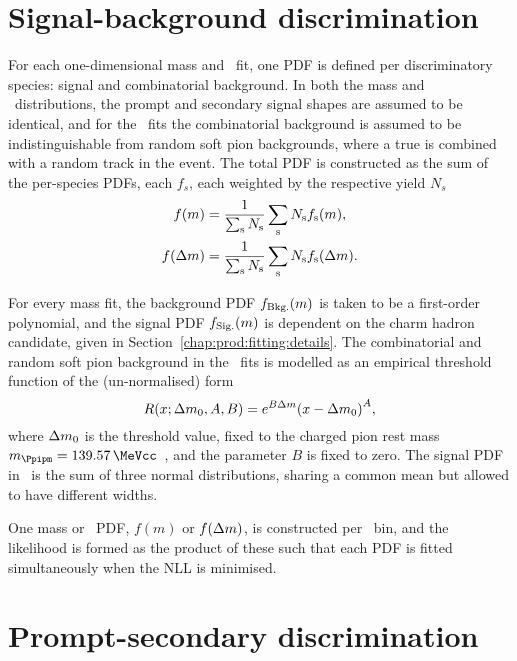 \section{Signal-background discrimination}
\label{chap:prod:fitting:mass}

For each one-dimensional mass and \deltam\ fit, one PDF is defined per 
discriminatory species: signal and combinatorial background.
In both the mass and \deltam\ distributions, the prompt and secondary signal 
shapes are assumed to be identical, and for the \deltam\ fits the combinatorial 
background is assumed to be indistinguishable from random soft pion 
backgrounds, where a true \PDzero is combined with a random track in the event.
The total \ac{PDF} is constructed as the sum of the per-species \acp{PDF}, each $f_{s}$, 
each weighted by the respective yield $N_{s}$
\begin{align}
  f(m) &= \frac{1}{\sum_{\textnormal{s}} N_{\textnormal{s}}}
          \sum_{\textnormal{s}} N_{\textnormal{s}}
          f_{\textnormal{s}}(m),\\
  f(\Delta{m}) &= \frac{1}{\sum_{\textnormal{s}} N_{\textnormal{s}}}
                \sum_{\textnormal{s}} N_{\textnormal{s}}
                f_{\textnormal{s}}(\Delta{m}).
\end{align}

For every mass fit, the background PDF $f_{\textnormal{Bkg.}}(m)$ is taken to 
be a first-order polynomial, and the signal PDF $f_{\textnormal{Sig.}}(m)$ is 
dependent on the charm hadron candidate, given in 
Section~\ref{chap:prod:fitting:details}.
The combinatorial and random soft pion background in the \deltam\ fits is 
modelled as an empirical threshold function of the (un-normalised) form
\begin{equation}
  R(x; \Delta{m}_{0}, A, B) = e^{B\Delta{m}}
    {(x - \Delta{m}_{0})}^A,
\end{equation}
where $\Delta{m}_{0}$ is the threshold value, fixed to the charged pion rest mass 
$m_{\Ppipm} = \SI{139.57}{\MeVcc}$~\cite{PDG2014}, and the parameter $B$ is 
fixed to zero.
The signal PDF in \deltam\ is the sum of three normal distributions, sharing a 
common mean but allowed to have different widths.

One mass or \deltam\ PDF, $f(m)$ or $f(\Delta{m})$, is constructed per \pTy\ bin, 
and the likelihood is formed as the product of these such that each PDF is 
fitted simultaneously when the \ac{NLL} is minimised.

\section{Prompt-secondary discrimination}
\label{chap:prod:fitting:ipchisq}

